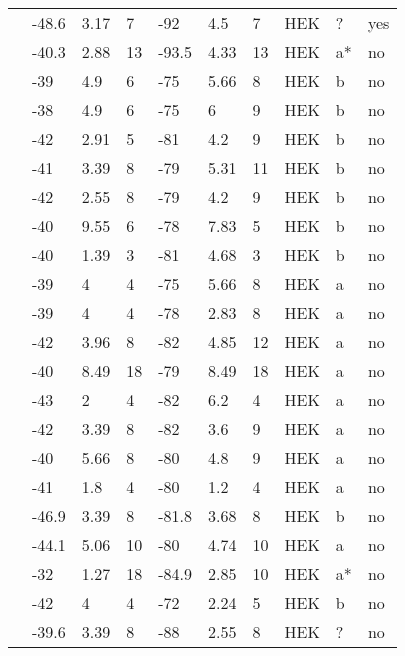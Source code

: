 \begin{footnotesize}
\begin{longtable}{p{5cm}|lll|lll|lll}
\citet{Tan2001MutationDB} & -48.6 & 3.17 & 7 & -92 & 4.5 & 7 & HEK & ? & yes \\
\citet{Tan2002MutationDB} & -40.3 & 2.88 & 13 & -93.5 & 4.33 & 13 & HEK & a* & no \\
\citet{Tan2005MutationDB} & -39 & 4.9 & 6 & -75 & 5.66 & 8 & HEK & b & no \\
\citet{Tan2005MutationDB} & -38 & 4.9 & 6 & -75 & 6 & 9 & HEK & b & no \\
\citet{Tan2005MutationDB} & -42 & 2.91 & 5 & -81 & 4.2 & 9 & HEK & b & no \\
\citet{Tan2005MutationDB} & -41 & 3.39 & 8 & -79 & 5.31 & 11 & HEK & b & no \\
\citet{Tan2005MutationDB} & -42 & 2.55 & 8 & -79 & 4.2 & 9 & HEK & b & no \\
\citet{Tan2005MutationDB} & -40 & 9.55 & 6 & -78 & 7.83 & 5 & HEK & b & no \\
\citet{Tan2005MutationDB} & -40 & 1.39 & 3 & -81 & 4.68 & 3 & HEK & b & no \\
\citet{Tan2005MutationDB} & -39 & 4 & 4 & -75 & 5.66 & 8 & HEK & a & no \\
\citet{Tan2005MutationDB} & -39 & 4 & 4 & -78 & 2.83 & 8 & HEK & a & no \\
\citet{Tan2005MutationDB} & -42 & 3.96 & 8 & -82 & 4.85 & 12 & HEK & a & no \\
\citet{Tan2005MutationDB} & -40 & 8.49 & 18 & -79 & 8.49 & 18 & HEK & a & no \\
\citet{Tan2005MutationDB} & -43 & 2 & 4 & -82 & 6.2 & 4 & HEK & a & no \\
\citet{Tan2005MutationDB} & -42 & 3.39 & 8 & -82 & 3.6 & 9 & HEK & a & no \\
\citet{Tan2005MutationDB} & -40 & 5.66 & 8 & -80 & 4.8 & 9 & HEK & a & no \\
\citet{Tan2005MutationDB} & -41 & 1.8 & 4 & -80 & 1.2 & 4 & HEK & a & no \\
\citet{Tan2006MutationDB} & -46.9 & 3.39 & 8 & -81.8 & 3.68 & 8 & HEK & b & no \\
\citet{Tan2006MutationDB} & -44.1 & 5.06 & 10 & -80 & 4.74 & 10 & HEK & a & no \\
\citet{Tarradas2013MutationDB} & -32 & 1.27 & 18 & -84.9 & 2.85 & 10 & HEK & a* & no \\
\citet{Tester2010MutationDB} & -42 & 4 & 4 & -72 & 2.24 & 5 & HEK & b & no \\
\citet{Tsurugi2009MutationDB} & -39.6 & 3.39 & 8 & -88 & 2.55 & 8 & HEK & ? & no \\

\end{longtable}
\end{footnotesize}
